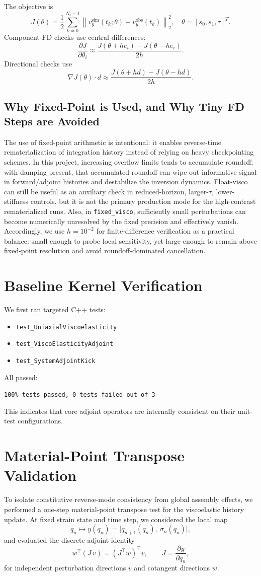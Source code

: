 \documentclass[11pt]{article}
\begin{document}
The objective is
\[
J(\theta)=\frac12\sum_{k=0}^{N_t-1}\left\|v_y^{\mathrm{sim}}(t_k;\theta)-v_y^{\mathrm{obs}}(t_k)\right\|_2^2,
\quad
\theta=[s_0,s_1,\tau]^T.
\]
Component FD checks use central differences:
\[
\frac{\partial J}{\partial \theta_i}\approx
\frac{J(\theta+h e_i)-J(\theta-h e_i)}{2h}.
\]
Directional checks use
\[
\nabla J(\theta)\cdot d \approx \frac{J(\theta+h d)-J(\theta-h d)}{2h}.
\]

\subsection*{Why Fixed-Point is Used, and Why Tiny FD Steps are Avoided}
The use of fixed-point arithmetic is intentional: it enables reverse-time rematerialization of integration history instead of relying on heavy checkpointing schemes.
In this project, increasing overflow limits tends to accumulate roundoff; with damping present, that accumulated roundoff can wipe out informative signal in forward/adjoint histories and destabilize the inversion dynamics.
Float-visco can still be useful as an auxiliary check in reduced-horizon, larger-\(\tau\), lower-stiffness controls, but it is not the primary production mode for the high-contrast rematerialized runs.
Also, in \texttt{fixed\_visco}, sufficiently small perturbations can become numerically unresolved by the fixed precision and effectively vanish.
Accordingly, we use \(h=10^{-2}\) for finite-difference verification as a practical balance: small enough to probe local sensitivity, yet large enough to remain above fixed-point resolution and avoid roundoff-dominated cancellation.

\section{Baseline Kernel Verification}
We first ran targeted C++ tests:
\begin{itemize}
\item \texttt{test\_UniaxialViscoelasticity}
\item \texttt{test\_ViscoElasticityAdjoint}
\item \texttt{test\_SystemAdjointKick}
\end{itemize}
All passed:
\begin{center}
\texttt{100\% tests passed, 0 tests failed out of 3}
\end{center}
This indicates that core adjoint operators are internally consistent on their unit-test configurations.

\section{Material-Point Transpose Validation}
To isolate constitutive reverse-mode consistency from global assembly effects, we performed a one-step material-point transpose test for the viscoelastic history update.
At fixed strain state and time step, we considered the local map
\[
q_n \mapsto y(q_n)=\big[q_{n+1}(q_n),\ \sigma_n(q_n)\big],
\]
and evaluated the discrete adjoint identity
\[
w^\top\!\left(J\,v\right)=\left(J^\top w\right)^\top v,
\qquad J=\frac{\partial y}{\partial q_n},
\]
for independent perturbation directions \(v\) and cotangent directions \(w\).
\end{document}
